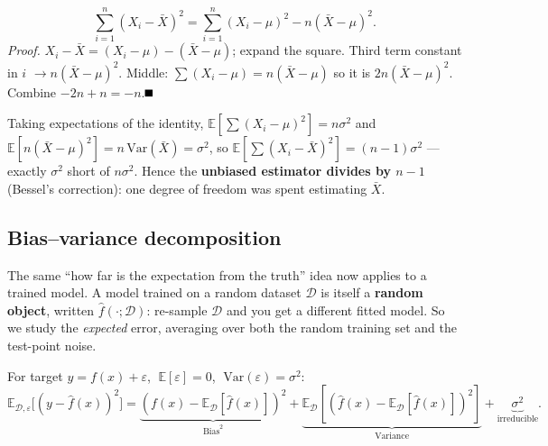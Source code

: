 \documentclass[11pt, a4paper]{article}
\providecommand{\blacksquare}{\rule{0.55em}{0.55em}}
\newcommand{\kw}[1]{\textbf{#1}}
\begin{document}
\begin{defbox}
\[
\textstyle\sum_{i=1}^n(X_i-\bar X)^2 = \sum_{i=1}^n(X_i-\mu)^2 - n(\bar X-\mu)^2.
\]
\emph{Proof.} $X_i-\bar X=(X_i-\mu)-(\bar X-\mu)$; expand the square. Third term constant in $i$
$\to n(\bar X-\mu)^2$. Middle: $\sum(X_i-\mu)=n(\bar X-\mu)$ so it is $2n(\bar X-\mu)^2$. Combine
$-2n+n=-n$.\hfill$\blacksquare$
\end{defbox}

Taking expectations of the identity, $\mathbb E[\sum(X_i-\mu)^2]=n\sigma^2$ and
$\mathbb E[n(\bar X-\mu)^2]=n\,\text{Var}(\bar X)=\sigma^2$, so
$\mathbb E[\sum(X_i-\bar X)^2]=(n-1)\sigma^2$ — exactly $\sigma^2$ short of $n\sigma^2$. Hence the
\kw{unbiased estimator divides by $n-1$} (Bessel's correction): one degree of freedom was spent
estimating $\bar X$.

\subsection{Bias–variance decomposition}

The same ``how far is the expectation from the truth'' idea now applies to a trained model. A model
trained on a random dataset $\mathcal D$ is itself a \kw{random object}, written
$\hat f(\cdot;\mathcal D)$: re-sample $\mathcal D$ and you get a different fitted model. So we study
the \emph{expected} error, averaging over both the random training set and the test-point noise.

\begin{defbox}
For target $y=f(x)+\varepsilon$, $\;\mathbb E[\varepsilon]=0$, $\;\text{Var}(\varepsilon)=\sigma^2$:
\[
\mathbb E_{\mathcal D,\varepsilon}\big[(y-\hat f(x))^2\big]
= \underbrace{(f(x)-\mathbb E_{\mathcal D}[\hat f(x)])^2}_{\text{Bias}^2}
+ \underbrace{\mathbb E_{\mathcal D}[(\hat f(x)-\mathbb E_{\mathcal D}[\hat f(x)])^2]}_{\text{Variance}}
+ \underbrace{\sigma^2}_{\text{irreducible}}.
\]
\end{defbox}
\end{document}
